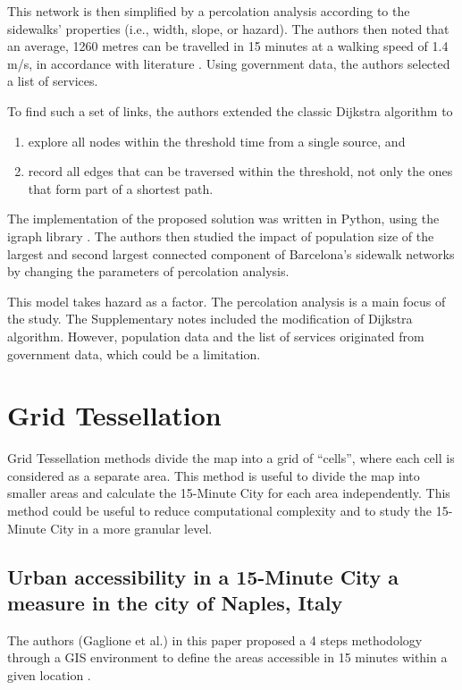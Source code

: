 This network is then simplified by a percolation analysis according to the sidewalks' properties (i.e., width, slope, or hazard). The authors then noted that an average, 1260 metres can be travelled in 15 minutes at a walking speed of 1.4 m/s, in accordance with literature \cite{bosina_estimating_2017}. Using government data, the authors selected a list of services.

To find such a set of links, the authors extended the classic Dijkstra algorithm to

\begin{enumerate}
\item explore all nodes within the threshold time from a single source, and
\item record all edges that can be traversed within the threshold, not only the ones that form part of a shortest path.
\end{enumerate}

The implementation of the proposed solution was written in Python, using the {igraph} library \cite{igraph}. The authors then studied the impact of population size of the largest and second largest connected component of Barcelona's sidewalk networks by changing the parameters of percolation analysis.

This model takes hazard as a factor. The percolation analysis is a main focus of the study. The Supplementary notes included the modification of Dijkstra algorithm. However, population data and the list of services originated from government data, which could be a limitation.

\section{Grid Tessellation}

Grid Tessellation methods divide the map into a grid of ``cells'', where each cell is considered as a separate area. This method is useful to divide the map into smaller areas and calculate the 15-Minute City for each area independently. This method could be useful to reduce computational complexity and to study the 15-Minute City in a more granular level.

\subsection{Urban accessibility in a 15-Minute City a measure in the city of Naples, Italy} \label{gaglione_urban_2022}

The authors (Gaglione et al.) in this paper proposed a 4 steps methodology through a GIS environment to define the areas accessible in 15 minutes within a given location \cite{gaglione_urban_2022}.

